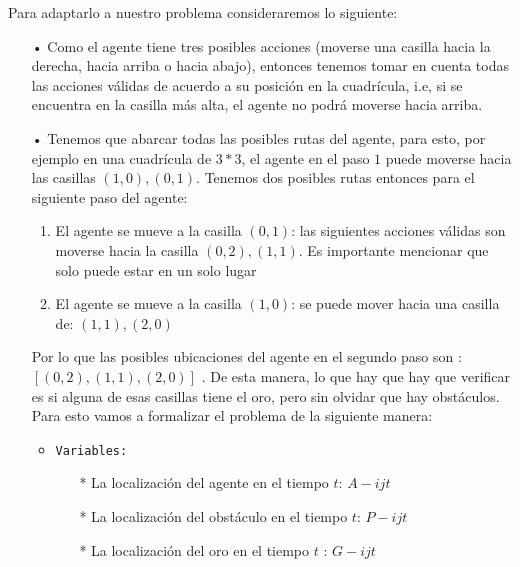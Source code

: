 \documentclass{article}
\begin{document}
 Para adaptarlo a nuestro problema consideraremos lo siguiente: 
 \begin{itemize}
 	\item[•]Como el agente tiene tres posibles acciones (moverse una casilla hacia la derecha, hacia arriba o hacia abajo), entonces tenemos tomar en cuenta todas las acciones válidas de acuerdo a su posición en la cuadrícula, i.e, si se encuentra en
 	la casilla más alta, el agente no podrá moverse hacia arriba. 
 	\item[•]Tenemos que abarcar todas las posibles rutas del agente, para esto, por ejemplo en una cuadrícula de $3*3$, el 
 	agente en el paso $1$ puede moverse hacia las casillas $(1,0),(0,1)$. Tenemos dos posibles rutas entonces para el siguiente paso del agente: 
 	\begin{enumerate}
 		\item El agente se mueve a la casilla $(0,1)$: las siguientes acciones válidas son moverse hacia la casilla $(0,2), (1,1)$. Es importante mencionar que solo puede estar en un solo lugar 
 		\item El agente se mueve a la casilla $(1,0)$: se puede mover hacia una casilla de: $(1,1),(2,0)$
 	\end{enumerate}
 	Por lo que las posibles ubicaciones del agente en el segundo paso son : $[(0,2),(1,1),(2,0)]$ . De esta manera, lo que hay 
 	que hay que verificar es si alguna de esas casillas tiene el oro, pero sin olvidar que hay obstáculos. Para esto vamos a formalizar el problema de la siguiente manera: 
 	\begin{itemize}
 		\item \texttt{Variables: } 
 		\begin{itemize}
 			\item[*]La localización del agente en el tiempo $t$: $A-ijt$
 			\item[*]La localización del obstáculo en el tiempo $t$: $P-ijt$
 			\item[*]La localización del oro en el tiempo $t$ : $G-ijt$
 			

\end{itemize}
\end{itemize}
\end{itemize}
\end{document}
